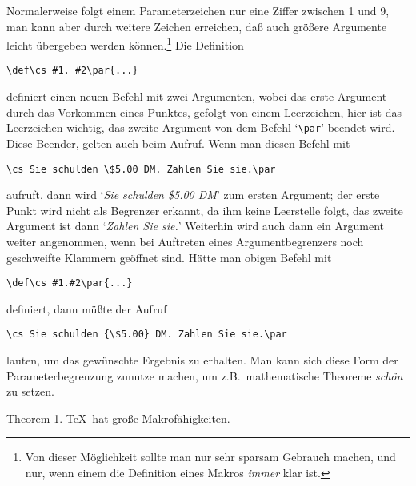 Normalerweise folgt einem Parameterzeichen nur eine 
Ziffer zwischen 1
und 9, man kann aber durch weitere Zeichen erreichen, da\ss{} auch gr\"o\ss{}ere
Argumente leicht \"ubergeben werden k\"onnen.\footnote{Von dieser
M\"oglichkeit sollte man nur sehr sparsam Gebrauch machen, und nur, wenn
einem die Definition eines Makros {\em immer} klar ist.} Die
Definition
\begin{verbatim}
\def\cs #1. #2\par{...}
\end{verbatim}
definiert einen neuen Befehl mit zwei Argumenten, wobei das erste
Argument durch das Vorkommen eines 
Punktes, gefolgt von einem
Leerzeichen, hier ist das 
Leerzeichen wichtig, das zweite Argument von
dem Befehl 
`\verb|\par|' beendet wird. Diese Beender, gelten auch beim
Aufruf. Wenn man diesen Befehl mit
\begin{verbatim}
\cs Sie schulden \$5.00 DM. Zahlen Sie sie.\par
\end{verbatim}
aufruft, dann wird `{\em Sie schulden \$5.00 DM}' zum ersten Argument;
der erste Punkt wird nicht als 
Begrenzer erkannt, da ihm keine
Leerstelle folgt, das zweite Argument ist dann `{\em Zahlen Sie sie.}'
Weiterhin wird auch dann ein Argument weiter angenommen, wenn bei
Auftreten eines Argumentbegrenzers noch geschweifte Klammern ge\"offnet
sind. H\"atte man obigen Befehl mit
\begin{verbatim}
\def\cs #1.#2\par{...}
\end{verbatim}
definiert, dann m\"u\ss{}te der Aufruf
\begin{verbatim}
\cs Sie schulden {\$5.00} DM. Zahlen Sie sie.\par
\end{verbatim}
lauten, um das gew\"unschte Ergebnis zu erhalten. Man kann sich diese
Form der Parameterbegrenzung zunutze machen, um z.B.\ mathematische
Theoreme {\em sch\"on} zu setzen.

\proclaim Theorem 1. \TeX\ hat gro\ss{}e Makrof\"ahigkeiten.\par

